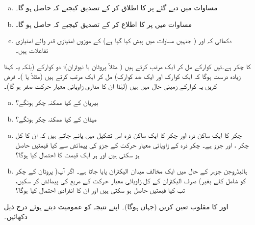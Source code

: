 \begin{enumerate}[a.]
\item
مساوات   میں دیے گئے  پر  کا اطلاق کر کے  تصدیق کیجیے
 کہ   حاصل ہو گا۔
\item
مساوات    میں  پر  کا اطلاع کر کے  تصدیق کیجیے  کہ   حاصل ہو گا۔
\item
دکھائی کہ   اور  ( جنہیں مساوات  میں پیش کیا گیا ہے)     کے موزوں  امتیازی قدر والے امتیازی تفاعلات ہیں۔ 
\end{enumerate}
  کا چکر  ہے۔تین کوارکے  مل کر ایک      مرتب کرتے ہیں ( مثلاً  پروٹان یا نیوٹران)؛   دو کوارکے  (بلکہ یہ کہنا زیادہ درست ہوگا کہ ایک کوارک اور ایک ضد کوارک) مل  کر ایک    مرتب کرتے   ہیں (مثلاً   یا  )۔ فرض کریں یہ  کوارکے زمینی حال میں ہیں  (لہٰذا ان کا مداری زاویائی معیار حرکت صفر  ہو گا)۔ 
\begin{enumerate}[a.]
\item
بیریان  کے کیا ممکنہ چکر ہونگے؟ 
\item
میذان کے کیا ممکنہ چکر ہونگے؟ 
\end{enumerate}
\begin{enumerate}[a.]
\item
چکر   کا ایک ساکن ذرہ اور  چکر   کا ایک ساکن ذرہ اس   تشکیل  میں پائے جاتے ہیں کہ ان کا کل چکر ،  اور  جزو  ہے۔ چکر   ذرہ کے زاویائی معیار حرکت کے  جزو کی پیمائش سے کیا قیمتیں حاصل ہو سکتی ہیں اور ہر ایک  قیمت کا احتمال کیا ہوگا؟ 
\item
ہائیڈروجن جوہر کے حال   میں ایک  مخالف میدان الیکٹران  پایا جاتا ہے۔  اگر آپ( پروٹان کے چکر کو شامل کئے بغیر)   صرف الیکٹران کے کل زاویائی معیار حرکت کے مربع کی پیمائش کر سکیں،  تب کیا قیمتیں حاصل ہو سکتی ہیں اور ان کا انفرادی احتمال کیا ہوگا؟ 
\end{enumerate}
 اور  کا مقلوب تعین کریں  (جہاں  ہوگا)۔  اپنے نتیجہ کو عمومیت دیتے ہوئے درج ذیل دکھائیں۔ 
